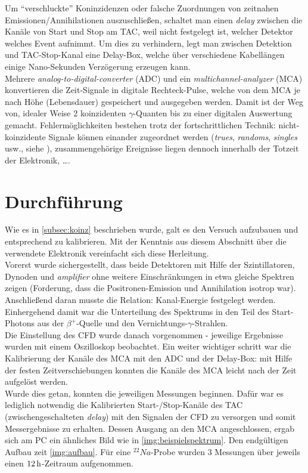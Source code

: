 \documentclass[numbers=noenddot,a4paper]{scrartcl}
\newcommand{\tilt}[1]{\textit{#1}}
\begin{document}
			Um "`verschluckte"' Koninzidenzen oder falsche Zuordnungen von zeitnahen Emissionen/Annihilationen auszuschließen, schaltet man einen \tilt{delay} zwischen die Kanäle von Start und Stop am TAC, weil nicht festgelegt ist, welcher Detektor welches Event aufnimmt. Um dies zu verhindern, legt man zwischen Detektion und TAC-Stop-Kanal eine Delay-Box, welche über verschiedene Kabellängen einige Nano-Sekunden Verzögerung erzeugen kann.\\
			Mehrere \tilt{analog-to-digital-converter} (ADC) und ein \tilt{multichannel-analyzer} (MCA) konvertieren die Zeit-Signale in digitale Rechteck-Pulse, welche von dem MCA je nach Höhe (Lebensdauer) gespeichert und ausgegeben werden. Damit ist der Weg von, idealer Weise 2 koinzidenten $\gamma$-Quanten bis zu einer digitalen Auswertung gemacht. Fehlermöglichkeiten bestehen trotz der fortschrittlichen Technik: nicht-koinzidente Signale können einander zugeordnet werden (\tilt{trues}, \tilt{randoms}, \tilt{singles} usw., siehe \cite{Wiki:PET}), zusammengehörige Ereignisse liegen dennoch innerhalb der Totzeit der Elektronik, \dots . 

	\newpage
	\section{Durchführung}

		Wie es in \ref{subsec:koinz} beschrieben wurde, galt es den Versuch aufzubauen und entsprechend zu kalibrieren. Mit der Kenntnis aus diesem Abschnitt über die verwendete Elektronik vereinfacht sich diese Herleitung.\\
		Vorerst wurde sichergestellt, dass beide Detektoren mit Hilfe der Szintillatoren, Dynoden und \tilt{amplifier} ohne weitere Einschränkungen in etwa gleiche Spektren zeigen (Forderung, dass die Positronen-Emission und Annihilation isotrop war). Anschließend daran musste die Relation: Kanal-Energie festgelegt werden. Einhergehend damit war die Unterteilung des Spektrums in den Teil des Start-Photons aus der $\beta^+$-Quelle und den Vernichtungs-$\gamma$-Strahlen. \\
		Die Einstellung des CFD wurde danach vorgenommen - jeweilige Ergebnisse wurden mit einem Oszilloskop beobachtet. Ein weiter wichtiger schritt war die Kalibrierung der Kanäle des MCA mit den ADC und der Delay-Box: mit Hilfe der festen Zeitverschiebungen konnten die Kanäle des MCA leicht nach der Zeit aufgelöst werden.\\
		Wurde dies getan, konnten die jeweiligen Messungen beginnen. Dafür war es lediglich notwendig die Kalibrierten Start-/Stop-Kanäle des TAC (zwischengeschalteten \tilt{delay}) mit den Signalen der CFD zu versorgen und somit Messergebnisse zu erhalten. Dessen Ausgang an den MCA angeschlossen, ergab sich am PC ein ähnliches Bild wie in \autoref{img:beispielspektrum}. Den endgültigen Aufbau zeit \autoref{img:aufbau}. Für eine $^{22}Na$-Probe wurden 3 Messungen über jeweils einen $\unit[12]{h}$-Zeitraum aufgenommen.
\end{document}

